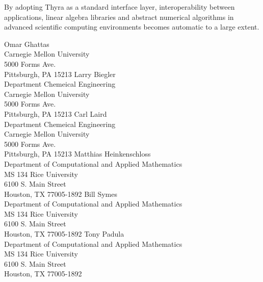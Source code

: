 \documentclass[pdf,ps2pdf,11pt]{SANDreport}
\begin{document}
By adopting Thyra as a standard interface layer, interoperability between
applications, linear algebra libraries and abstract numerical algorithms in
advanced scientific computing environments becomes automatic to a large
extent.

%
\clearpage



%
\appendix


\begin{SANDdistribution}
 Omar Ghattas \\ Carnegie Mellon University\\5000 Forms Ave.\\Pittsburgh, PA 15213
 Larry Biegler \\ Department Chemeical Engineering\\Carnegie Mellon University\\5000 Forms Ave.\\Pittsburgh, PA 15213
 Carl Laird \\ Department Chemeical Engineering\\Carnegie Mellon University\\5000 Forms Ave.\\Pittsburgh, PA 15213
 Matthias Heinkenschloss \\ Department of Computational and Applied Mathematics\\MS 134 Rice University\\
6100 S. Main Street\\Houston, TX 77005-1892
 Bill Symes\\Department of Computational and Applied Mathematics\\MS 134 Rice University\\
6100 S. Main Street\\Houston, TX 77005-1892
 Tony Padula\\Department of Computational and Applied Mathematics\\MS 134 Rice University\\
6100 S. Main Street\\Houston, TX 77005-1892

\end{SANDdistribution}
\end{document}
